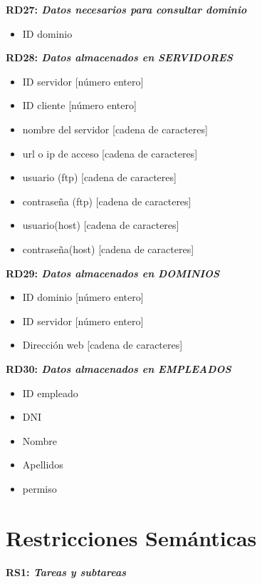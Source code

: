 \documentclass[paper=a4, fontsize=11pt, spanish]{scrartcl}
\begin{document}
\setlength{\parindent}{0em}
\textbf{RD27: \textit{Datos necesarios para consultar dominio}}
\setlength{\parindent}{2em}
\begin{itemize}
  \item ID dominio
\end{itemize}

\setlength{\parindent}{0em}
\textbf{RD28: \textit{Datos almacenados en SERVIDORES}}
\setlength{\parindent}{2em}
\begin{itemize}
  \item ID servidor [número entero]
  \item ID cliente [número entero]
  \item nombre del servidor [cadena de caracteres]
  \item url o ip de acceso [cadena de caracteres]
  \item usuario (ftp) [cadena de caracteres]
  \item contraseña (ftp) [cadena de caracteres]
  \item usuario(host) [cadena de caracteres]
  \item contraseña(host) [cadena de caracteres]
\end{itemize}

\setlength{\parindent}{0em}
\textbf{RD29: \textit{Datos almacenados en DOMINIOS}}
\setlength{\parindent}{2em}
\begin{itemize}
  \item ID dominio [número entero]
  \item ID servidor [número entero]
  \item Dirección web [cadena de caracteres]
\end{itemize}

\setlength{\parindent}{0em}
\textbf{RD30: \textit{Datos almacenados en EMPLEADOS}}
\setlength{\parindent}{2em}
\begin{itemize}
  \item ID empleado
  \item DNI
  \item Nombre
  \item Apellidos
  \item permiso
\end{itemize}

\section{Restricciones Semánticas}
\setlength{\parindent}{0em}
\textbf{RS1: \textit{Tareas y subtareas}}
\setlength{\parindent}{2em}
\end{document}
